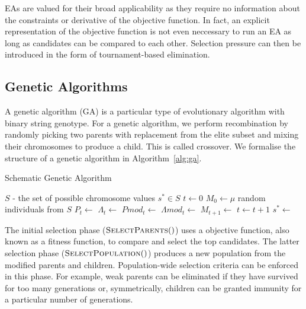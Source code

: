 EAs are valued for their broad applicability as they require no information about the constraints or derivative of the objective function. In fact, an explicit representation of the objective function is not even neccessary to run an EA as long as candidates can be compared to each other. Selection pressure can then be introduced in the form of tournament-based elimination.\\

\subsection{Genetic Algorithms}

A genetic algorithm (GA) is a particular type of evolutionary algorithm with binary string genotype. For a genetic algorithm, we perform recombination by randomly picking two parents with replacement from the elite subset and mixing their chromosomes to produce a child. This is called crossover. We formalise the structure of a genetic algorithm in Algorithm~\ref{alg:ga}.\\

\begin{algorithm}
  \caption{Schematic Genetic Algorithm}\label{alg:ga}
  \begin{algorithmic}
  \Require $S$ - the set of possible chromosome values
  \Ensure $s^* \in S$
  \State $t \gets 0$
  \State $M_0 \gets \mu$ random individuals from $S$
    \State {}
    \State $P_t \gets$     
    \State $\Lambda_t \gets$   
    \State $Pmod_t \gets$ 
    \State $\Lambda mod_t \gets$ 
    \State $M_{t+1} \gets$ 
    \State $t \gets t+1$
  \EndWhile
  \State $s^* \gets$ 
  \end{algorithmic}
\end{algorithm}

The initial selection phase ($\Call{SelectParents}$) uses a objective function, also known as a fitness function, to compare and select the top candidates. The latter selection phase ($\Call{SelectPopulation}$) produces a new population from the modified parents and children. Population-wide selection criteria can be enforced in this phase. For example, weak parents can be eliminated if they have survived for too many generations or, symmetrically, children can be granted immunity for a particular number of generations.\\

